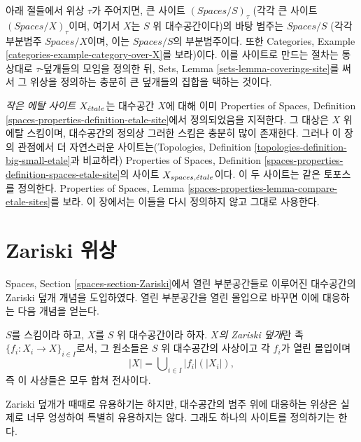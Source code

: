 \medskip\noindent
아래 절들에서 위상 $\tau$가 주어지면, 큰 사이트
$(\textit{Spaces}/S)_\tau$ (각각 큰 사이트
$(\textit{Spaces}/X)_\tau$이며, 여기서 $X$는 $S$ 위 대수공간이다)의
바탕 범주는 $\textit{Spaces}/S$ (각각 부분범주 $\textit{Spaces}/X$이며,
이는 $\textit{Spaces}/S$의 부분범주이다. 또한
Categories, Example \ref{categories-example-category-over-X}를 보라)이다.
이를 사이트로 만드는 절차는 통상대로 $\tau$-덮개들의 모임을 정의한 뒤,
Sets, Lemma \ref{sets-lemma-coverings-site}를 써서 그 위상을 정의하는
충분히 큰 덮개들의 집합을 택하는 것이다.

\medskip\noindent
{\it 작은 에탈 사이트 $X_{\acute{e}tale}$}는 대수공간 $X$에 대해 이미 Properties of
Spaces, Definition \ref{spaces-properties-definition-etale-site}에서
정의되었음을 지적한다. 그 대상은 $X$ 위 에탈 스킴이며, 대수공간의
정의상 그러한 스킴은 충분히 많이 존재한다.
그러나 이 장의 관점에서 더 자연스러운 사이트는(Topologies, Definition
\ref{topologies-definition-big-small-etale}과 비교하라) Properties of
Spaces, Definition \ref{spaces-properties-definition-spaces-etale-site}의
사이트 $X_{spaces, {\acute{e}tale}}$이다. 이 두 사이트는 같은 토포스를 정의한다.
Properties of Spaces, Lemma
\ref{spaces-properties-lemma-compare-etale-sites}를 보라. 이 장에서는
이들을 다시 정의하지 않고 그대로 사용한다.





\section{Zariski 위상}
\label{section-zariski}

\noindent
Spaces, Section \ref{spaces-section-Zariski}에서 열린 부분공간들로 이루어진
대수공간의 Zariski 덮개 개념을 도입하였다. 열린 부분공간을 열린 몰입으로
바꾸면 이에 대응하는 다음 개념을 얻는다.

\begin{definition}
\label{definition-zariski-covering}
$S$를 스킴이라 하고, $X$를 $S$ 위 대수공간이라 하자. {\it $X$의
Zariski 덮개}란 족 $\{f_i : X_i \to X\}_{i \in I}$로서, 그 원소들은
$S$ 위 대수공간의 사상이고 각 $f_i$가 열린 몰입이며
$$
|X| = \bigcup\nolimits_{i \in I} |f_i|(|X_i|),
$$
즉 이 사상들은 모두 합쳐 전사이다.
\end{definition}

\noindent
Zariski 덮개가 때때로 유용하기는 하지만, 대수공간의 범주 위에 대응하는
위상은 실제로 너무 엉성하여 특별히 유용하지는 않다. 그래도 하나의
사이트를 정의하기는 한다.

